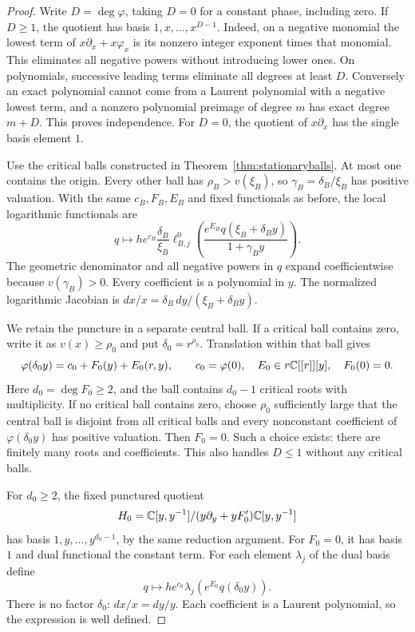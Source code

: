 \begin{proof}
Write $D=\deg\varphi$, taking $D=0$ for a constant phase, including
zero. If $D\geq1$, the quotient has basis
$1,x,\ldots,x^{D-1}$. Indeed, on a negative monomial the lowest term
of $x\partial_x+x\varphi_x$ is its nonzero integer exponent times
that monomial. This eliminates all negative powers without introducing
lower ones. On polynomials, successive leading terms eliminate all
degrees at least $D$. Conversely an exact polynomial cannot come
from a Laurent polynomial with a negative lowest term, and a nonzero
polynomial preimage of degree $m$ has exact degree $m+D$.
This proves independence. For $D=0$, the quotient of $x\partial_x$
has the single basis element $1$.

Use the critical balls constructed in Theorem~\ref{thm:stationaryballs}.
At most one contains the origin. Every other ball has
$\rho_B>v(\xi_B)$, so $\gamma_B=\delta_B/\xi_B$ has positive
valuation. With the same $c_B,F_B,E_B$ and fixed functionals as before,
the local logarithmic functionals are
\begin{equation}\label{eq:puncturedaway}
 q\longmapsto h e^{c_B}\frac{\delta_B}{\xi_B}
  \ell^0_{B,j}\!\left(
      \frac{e^{E_B}q(\xi_B+\delta_B y)}{1+\gamma_B y}\right).
\end{equation}
The geometric denominator and all negative powers in $q$ expand
coefficientwise because $v(\gamma_B)>0$. Every coefficient is a
polynomial in $y$. The normalized logarithmic Jacobian is
$dx/x=\delta_B\,dy/(\xi_B+\delta_B y)$.

We retain the puncture in a separate central ball. If a critical
ball contains zero, write it as $v(x)\geq\rho_0$ and put
$\delta_0=r^{\rho_0}$. Translation within that ball gives
\[
 \varphi(\delta_0 y)=c_0+F_0(y)+E_0(r,y),\qquad
 c_0=\varphi(0),\quad E_0\in r\mathbb C[[r]][y],\quad F_0(0)=0.
\]
Here $d_0=\deg F_0\geq2$, and the ball contains $d_0-1$
critical roots with multiplicity. If no critical ball contains zero,
choose $\rho_0$ sufficiently large that the central ball is disjoint
from all critical balls and every nonconstant coefficient of
$\varphi(\delta_0 y)$ has positive valuation. Then $F_0=0$.
Such a choice exists: there are finitely many roots and coefficients.
This also handles $D\leq1$ without any critical balls.

For $d_0\geq2$, the fixed punctured quotient
\[
 H_0=\mathbb C[y,y^{-1}]/(y\partial_y+yF_0')\mathbb C[y,y^{-1}]
\]
has basis $1,y,\ldots,y^{d_0-1}$, by the same reduction argument.
For $F_0=0$, it has basis $1$ and dual functional the constant term.
For each element $\lambda_j$ of the dual basis define
\begin{equation}\label{eq:puncturedcentral}
 q\longmapsto h e^{c_0}\lambda_j
                   \!\left(e^{E_0}q(\delta_0 y)\right).
\end{equation}
There is no factor $\delta_0$: $dx/x=dy/y$. Each coefficient is
a Laurent polynomial, so the expression is well defined.


\end{proof}
